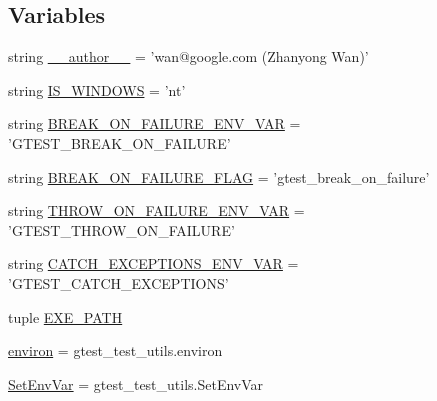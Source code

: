 \subsection*{Variables}
\begin{DoxyCompactItemize}
\item 
string \hyperlink{namespacegtest__break__on__failure__unittest_a3d6a5c600af8e8c6a21407bc2042b38a}{\-\_\-\-\_\-author\-\_\-\-\_\-} = 'wan@google.\-com (Zhanyong Wan)'
\item 
string \hyperlink{namespacegtest__break__on__failure__unittest_aec67fcd1a946db2d8c747f6519a5bb05}{I\-S\-\_\-\-W\-I\-N\-D\-O\-W\-S} = 'nt'
\item 
string \hyperlink{namespacegtest__break__on__failure__unittest_a95b56c611c5844be4247700787a175a1}{B\-R\-E\-A\-K\-\_\-\-O\-N\-\_\-\-F\-A\-I\-L\-U\-R\-E\-\_\-\-E\-N\-V\-\_\-\-V\-A\-R} = 'G\-T\-E\-S\-T\-\_\-\-B\-R\-E\-A\-K\-\_\-\-O\-N\-\_\-\-F\-A\-I\-L\-U\-R\-E'
\item 
string \hyperlink{namespacegtest__break__on__failure__unittest_a04adcb60898d929007033e178c772e88}{B\-R\-E\-A\-K\-\_\-\-O\-N\-\_\-\-F\-A\-I\-L\-U\-R\-E\-\_\-\-F\-L\-A\-G} = 'gtest\-\_\-break\-\_\-on\-\_\-failure'
\item 
string \hyperlink{namespacegtest__break__on__failure__unittest_ac5edd000e7dc4212c8c7ce947ebd3b72}{T\-H\-R\-O\-W\-\_\-\-O\-N\-\_\-\-F\-A\-I\-L\-U\-R\-E\-\_\-\-E\-N\-V\-\_\-\-V\-A\-R} = 'G\-T\-E\-S\-T\-\_\-\-T\-H\-R\-O\-W\-\_\-\-O\-N\-\_\-\-F\-A\-I\-L\-U\-R\-E'
\item 
string \hyperlink{namespacegtest__break__on__failure__unittest_a0c1cd8079b97c6924156075c6c9733c3}{C\-A\-T\-C\-H\-\_\-\-E\-X\-C\-E\-P\-T\-I\-O\-N\-S\-\_\-\-E\-N\-V\-\_\-\-V\-A\-R} = 'G\-T\-E\-S\-T\-\_\-\-C\-A\-T\-C\-H\-\_\-\-E\-X\-C\-E\-P\-T\-I\-O\-N\-S'
\item 
tuple \hyperlink{namespacegtest__break__on__failure__unittest_aa546748fb3f26cc797f240387333fc3a}{E\-X\-E\-\_\-\-P\-A\-T\-H}
\item 
\hyperlink{namespacegtest__break__on__failure__unittest_a6d74240e4ea26e0a68e1025f9b8c878d}{environ} = gtest\-\_\-test\-\_\-utils.\-environ
\item 
\hyperlink{namespacegtest__break__on__failure__unittest_a6d10069714f75f3f755c1d2c9c0ddd15}{Set\-Env\-Var} = gtest\-\_\-test\-\_\-utils.\-Set\-Env\-Var
\end{DoxyCompactItemize}


